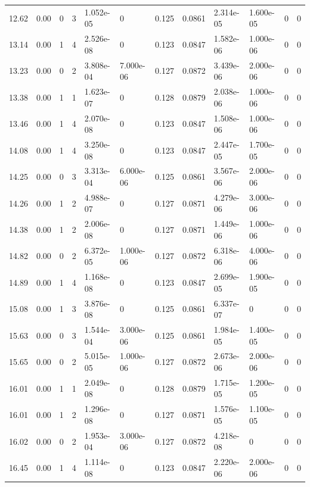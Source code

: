 \documentclass[preview]{standalone}
\begin{document}
{{{\begin{tabular}{L{1.2cm}C{1.2cm} C{0.3cm}C{0.5cm} C{1.4cm}C{1.4cm} C{1.4cm}C{1.4cm} C{1.6cm}C{1.6cm} C{1.6cm}C{1.6cm}}
  12.62  &  0.00  & 0     &  3 &  1.052e-05  & 0  &  0.125&   0.0861& 2.314e-05 & 1.600e-05   &  0 & 0  \\ 
  13.14  &  0.00  & 1     &  4 &  2.526e-08  & 0  &  0.123&   0.0847& 1.582e-06 & 1.000e-06   &  0 & 0  \\ 
  13.23  &  0.00  & 0     &  2 &  3.808e-04  & 7.000e-06  &  0.127&   0.0872& 3.439e-06 & 2.000e-06   &  0 & 0  \\ 
  13.38  &  0.00  & 1     &  1 &  1.623e-07  & 0  &  0.128&   0.0879& 2.038e-06 & 1.000e-06   &  0 & 0  \\ 
  13.46  &  0.00  & 1     &  4 &  2.070e-08  & 0  &  0.123&   0.0847& 1.508e-06 & 1.000e-06   &  0 & 0  \\ 
  14.08  &  0.00  & 1     &  4 &  3.250e-08  & 0  &  0.123&   0.0847& 2.447e-05 & 1.700e-05   &  0 & 0  \\ 
  14.25  &  0.00  & 0     &  3 &  3.313e-04  & 6.000e-06  &  0.125&   0.0861& 3.567e-06 & 2.000e-06   &  0 & 0  \\ 
  14.26  &  0.00  & 1     &  2 &  4.988e-07  & 0  &  0.127&   0.0871& 4.279e-06 & 3.000e-06   &  0 & 0  \\ 
  14.38  &  0.00  & 1     &  2 &  2.006e-08  & 0  &  0.127&   0.0871& 1.449e-06 & 1.000e-06   &  0 & 0  \\ 
  14.82  &  0.00  & 0     &  2 &  6.372e-05  & 1.000e-06  &  0.127&   0.0872& 6.318e-06 & 4.000e-06   &  0 & 0  \\ 
  14.89  &  0.00  & 1     &  4 &  1.168e-08  & 0  &  0.123&   0.0847& 2.699e-05 & 1.900e-05   &  0 & 0  \\ 
  15.08  &  0.00  & 1     &  3 &  3.876e-08  & 0  &  0.125&   0.0861& 6.337e-07 & 0   &  0 & 0  \\ 
  15.63  &  0.00  & 0     &  3 &  1.544e-04  & 3.000e-06  &  0.125&   0.0861& 1.984e-05 & 1.400e-05   &  0 & 0  \\ 
  15.65  &  0.00  & 0     &  2 &  5.015e-05  & 1.000e-06  &  0.127&   0.0872& 2.673e-06 & 2.000e-06   &  0 & 0  \\ 
  16.01  &  0.00  & 1     &  1 &  2.049e-08  & 0  &  0.128&   0.0879& 1.715e-05 & 1.200e-05   &  0 & 0  \\ 
  16.01  &  0.00  & 1     &  2 &  1.296e-08  & 0  &  0.127&   0.0871& 1.576e-05 & 1.100e-05   &  0 & 0  \\ 
  16.02  &  0.00  & 0     &  2 &  1.953e-04  & 3.000e-06  &  0.127&   0.0872& 4.218e-08 & 0   &  0 & 0  \\ 
  16.45  &  0.00  & 1     &  4 &  1.114e-08  & 0  &  0.123&   0.0847& 2.220e-06 & 2.000e-06   &  0 & 0  \\ 

\end{tabular}}}}
\end{document}
